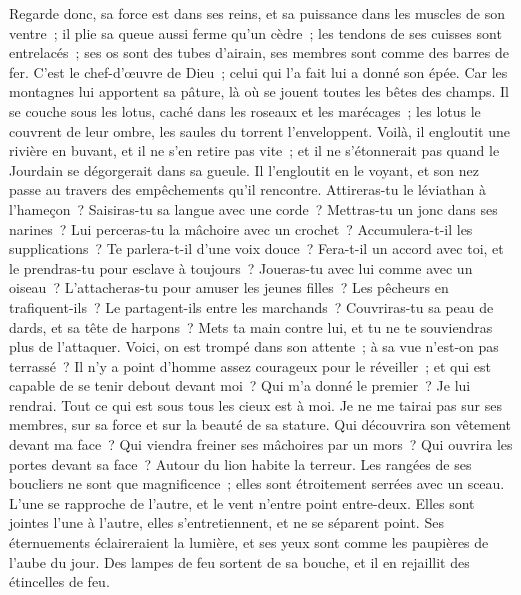 \begin{multicols}{2}
Regarde donc, sa force est dans ses reins, et sa puissance dans les muscles de son ventre~;
il plie sa queue aussi ferme qu'un cèdre~; les tendons de ses cuisses sont entrelacés~;
ses os sont des tubes d'airain, ses membres sont comme des barres de fer.
C'est le chef-d'œuvre de Dieu~; celui qui l'a fait lui a donné son épée.
Car les montagnes lui apportent sa pâture, là où se jouent toutes les bêtes des champs.
Il se couche sous les lotus, caché dans les roseaux et les marécages~;
les lotus le couvrent de leur ombre, les saules du torrent l'enveloppent.
Voilà, il engloutit une rivière en buvant, et il ne s'en retire pas vite~; et il ne s'étonnerait pas quand le Jourdain se dégorgerait dans sa gueule. 
Il l'engloutit en le voyant, et son nez passe au travers des empêchements qu'il rencontre. 
Attireras-tu le léviathan à l'hameçon~? Saisiras-tu sa langue avec une corde~?
Mettras-tu un jonc dans ses narines~? Lui perceras-tu la mâchoire avec un crochet~?
Accumulera-t-il les supplications~? Te parlera-t-il d'une voix douce~?
Fera-t-il un accord avec toi, et le prendras-tu pour esclave à toujours~? 
Joueras-tu avec lui comme avec un oiseau~? L'attacheras-tu pour amuser les jeunes filles~?
Les pêcheurs en trafiquent-ils~? Le partagent-ils entre les marchands~?
Couvriras-tu sa peau de dards, et sa tête de harpons~?
Mets ta main contre lui, et tu ne te souviendras plus de l'attaquer.
Voici, on est trompé dans son attente~; à sa vue n'est-on pas terrassé~?
\VerseOne{}Il n'y a point d'homme assez courageux pour le réveiller~; et qui est capable de se tenir debout devant moi~?
Qui m'a donné le premier~? Je lui rendrai. Tout ce qui est sous tous les cieux est à moi.
Je ne me tairai pas sur ses membres, sur sa force et sur la beauté de sa stature.
Qui découvrira son vêtement devant ma face~? Qui viendra freiner ses mâchoires par un mors~?
Qui ouvrira les portes devant sa face~? Autour du lion habite la terreur.
Les rangées de ses boucliers ne sont que magnificence~; elles sont étroitement serrées avec un sceau.
L'une se rapproche de l'autre, et le vent n'entre point entre-deux. 
Elles sont jointes l'une à l'autre, elles s'entretiennent, et ne se séparent point. 
Ses éternuements éclaireraient la lumière, et ses yeux sont comme les paupières de l'aube du jour. 
Des lampes de feu sortent de sa bouche, et il en rejaillit des étincelles de feu. 

\end{multicols}
